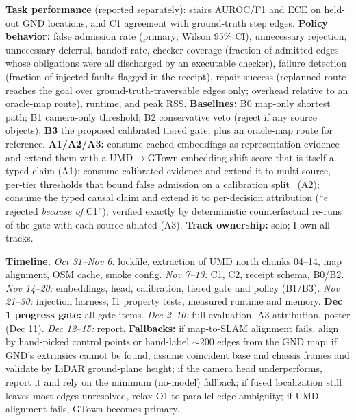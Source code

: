 \documentclass[10pt,letterpaper]{article}
\begin{document}
\textbf{Task performance} (reported separately): stairs AUROC/F1 and ECE on held-out GND locations, and C1 agreement with
ground-truth step edges. \textbf{Policy behavior:} false admission rate (primary; Wilson 95\% CI),
unnecessary rejection, unnecessary deferral, handoff rate, checker coverage (fraction of admitted
edges whose obligations were all discharged by an executable checker), failure detection (fraction of
injected faults flagged in the receipt), repair success (replanned route reaches the goal over
ground-truth-traversable edges only; overhead relative to an oracle-map route), runtime, and peak RSS.
\textbf{Baselines:} B0 map-only shortest path; B1 camera-only threshold; B2 conservative veto (reject
if any source objects); \textbf{B3} the proposed calibrated tiered gate; plus an oracle-map route for
reference. \textbf{A1/A2/A3:} consume cached embeddings as representation evidence and extend them
with a UMD$\to$GTown embedding-shift score that is itself a typed claim (A1); consume calibrated
evidence and extend it to multi-source, per-tier thresholds that bound false admission on a
calibration split~\cite{conformal} (A2); consume the typed causal claim and extend it to per-decision
attribution (``$e$ rejected \emph{because of} C1''), verified exactly by deterministic counterfactual
re-runs of the gate with each source ablated (A3).
\textbf{Track ownership:} solo; I own all tracks.

\textbf{Timeline.} \emph{Oct 31--Nov 6:} lockfile, extraction of UMD north chunks 04--14, map alignment,
OSM cache, smoke config. \emph{Nov 7--13:} C1, C2, receipt schema, B0/B2. \emph{Nov 14--20:}
embeddings, head, calibration, tiered gate and policy (B1/B3). \emph{Nov 21--30:} injection harness,
I1 property tests, measured runtime and memory. \textbf{Dec 1 progress gate:} all gate items.
\emph{Dec 2--10:} full evaluation, A3 attribution, poster (Dec 11). \emph{Dec 12--15:} report.
\textbf{Fallbacks:} if map-to-SLAM alignment fails, align by hand-picked control points or
hand-label $\sim$200 edges from the GND map; if GND's extrinsics cannot be found, assume coincident
base and chassis frames and validate by LiDAR ground-plane height; if the camera head underperforms, report it and rely on
the minimum (no-model) fallback; if fused localization still leaves most edges unresolved, relax O1
to parallel-edge ambiguity; if UMD alignment fails, GTown becomes primary.
\end{document}
